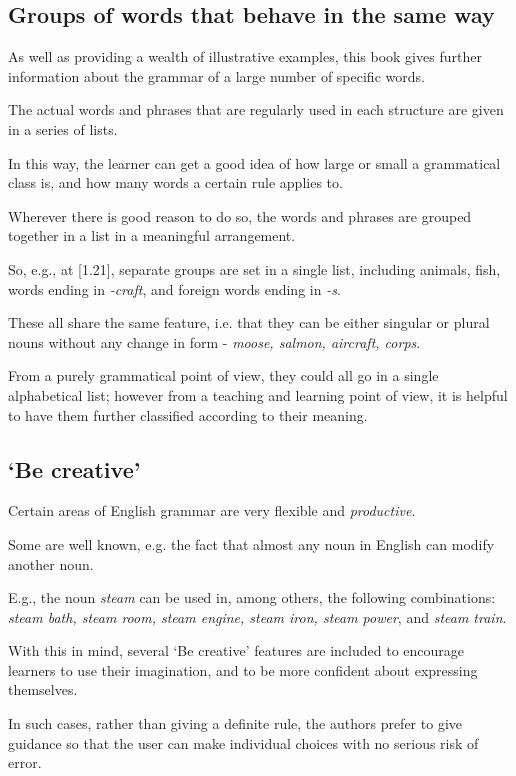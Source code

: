 \documentclass[oneside]{book}
\numberwithin{equation}{section}
\begin{document}
\subsection{Groups of words that behave in the same way}
As well as providing a wealth of illustrative examples, this book gives further information about the grammar of a large number of specific words.

The actual words and phrases that are regularly used in each structure are given in a series of lists.

In this way, the learner can get a good idea of how large or small a grammatical class is, and how many words a certain rule applies to.

%
Wherever there is good reason to do so, the words and phrases are grouped together in a list in a meaningful arrangement.

So, e.g., at [1.21], separate groups are set in a single list, including animals, fish, words ending in \textit{-craft}, and foreign words ending in \textit{-s}.

These all share the same feature, i.e. that they can be either singular or plural nouns without any change in form - \textit{moose, salmon, aircraft, corps}.

From a purely grammatical point of view, they could all go in a single alphabetical list; however from a teaching and learning point of view, it is helpful to have them further classified according to their meaning.

\subsection{`Be creative'}
Certain areas of English grammar are very flexible and \textit{productive}.

Some are well known, e.g. the fact that almost any noun in English can modify another noun.

E.g., the noun \textit{steam} can be used in, among others, the following combinations: \textit{steam bath, steam room, steam engine, steam iron, steam power}, and \textit{steam train}.

%
With this in mind, several `Be creative' features are included to encourage learners to use their imagination, and to be more confident about expressing themselves.

In such cases, rather than giving a definite rule, the authors prefer to give guidance so that the user can make individual choices with no serious risk of error.
\end{document}
